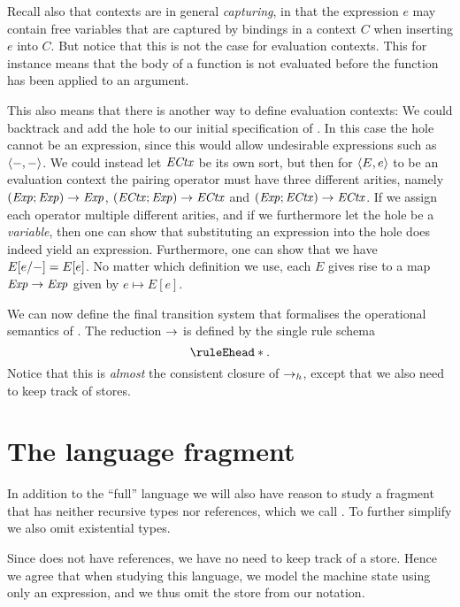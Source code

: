Recall also that contexts are in general \emph{capturing}, in that the expression $e$ may contain free variables that are captured by bindings in a context $C$ when inserting $e$ into $C$. But notice that this is not the case for evaluation contexts. This for instance means that the body of a function is not evaluated before the function has been applied to an argument.

This also means that there is another way to define evaluation contexts: We could backtrack and add the hole to our initial specification of \langrecref{}. In this case the hole cannot be an expression, since this would allow undesirable expressions such as $\langle\textcolor{black}{{-}},\textcolor{black}{{-}}\rangle$. We could instead let $\mathit{ECtx}$ be its own sort, but then for $\langle\textcolor{black}{E},\textcolor{black}{e}\rangle$ to be an evaluation context the pairing operator must have three different arities, namely $(\mathit{Exp};\mathit{Exp}) \to \mathit{Exp}$, $(\mathit{ECtx};\mathit{Exp}) \to \mathit{ECtx}$ and $(\mathit{Exp};\mathit{ECtx}) \to \mathit{ECtx}$. If we assign each operator multiple different arities, and if we furthermore let the hole be a \emph{variable}, then one can show that substituting an expression into the hole does indeed yield an expression. Furthermore, one can show that we have $E[e/{-}] = E[e]$. No matter which definition we use, each $E$ gives rise to a map $\mathit{Exp} \to \mathit{Exp}$ given by $e \mapsto E[e]$. %

We can now define the final transition system that formalises the operational semantics of \langrecref{}. The reduction $\to$ is defined by the single rule schema
%
\begin{equation*}
    \ruleEhead*.
\end{equation*}
%
Notice that this is \emph{almost} the consistent closure of $\to_h$, except that we also need to keep track of stores.


\section{The language fragment \langpure}\label{sec:langpure}

In addition to the \enquote{full} language \langrecref{} we will also have reason to study a fragment that has neither recursive types nor references, which we call \langpure{}. To further simplify we also omit existential types.

Since \langpure{} does not have references, we have no need to keep track of a store. Hence we agree that when studying this language, we model the machine state using only an expression, and we thus omit the store from our notation.

